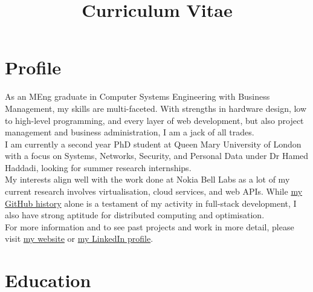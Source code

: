 \documentclass[10pt,a4paper,sans]{moderncv} %
\title{Curriculum Vitae}
\begin{document}
\makecvtitle

\section{Profile}

\hspace*{15pt}
As an MEng graduate in Computer Systems Engineering with Business Management, my skills are multi-faceted. With strengths in hardware design, low to high-level programming, and every layer of web development, but also project management and business administration, I am a jack of all trades.
\\[4pt]
\hspace*{15pt}
I am currently a second year PhD student at Queen Mary University of London with a focus on Systems, Networks, Security, and Personal Data under Dr Hamed Haddadi, looking for summer research internships.
\\[4pt]
\hspace*{15pt}
My interests align well with the work done at Nokia Bell Labs as a lot of my current research involves virtualisation, cloud services, and web APIs. While \href{https://github.com/yousefamar}{my GitHub history} alone is a testament of my activity in full-stack development, I also have strong aptitude for distributed computing and optimisation.
\\[4pt]
\hspace*{15pt}
For more information and to see past projects and work in more detail, please visit \href{http://yousefamar.com}{my website} or \href{https://linkedin.com/in/yousefamar}{my LinkedIn profile}.


\section{Education}
\end{document}
